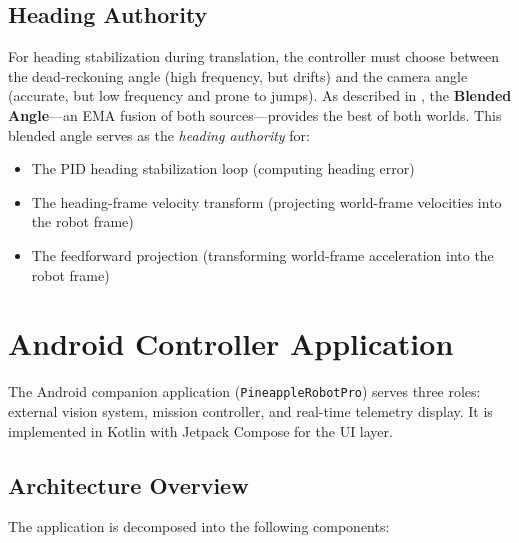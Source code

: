 \documentclass[12pt, a4paper, twoside]{article}
\begin{document}
\subsection{Heading Authority}

For heading stabilization during translation, the controller must choose between the dead-reckoning angle (high frequency, but drifts) and the camera angle (accurate, but low frequency and prone to jumps). As described in , the \textbf{Blended Angle}---an EMA fusion of both sources---provides the best of both worlds. This blended angle serves as the \emph{heading authority} for:

\begin{itemize}
    \item The PID heading stabilization loop (computing heading error)
    \item The heading-frame velocity transform (projecting world-frame velocities into the robot frame)
    \item The feedforward projection (transforming world-frame acceleration into the robot frame)
\end{itemize}

\section{Android Controller Application}
\label{sec:android}

The Android companion application (\texttt{PineappleRobotPro}) serves three roles: external vision system, mission controller, and real-time telemetry display. It is implemented in Kotlin with Jetpack Compose for the UI layer.

\subsection{Architecture Overview}

The application is decomposed into the following components:
\end{document}
